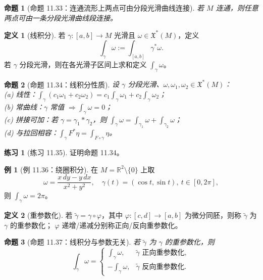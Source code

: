 \documentclass[12pt,a4paper]{article}
\theoremstyle{definition}
\newtheorem{definition}{定义}[section]
\newtheorem{example}{例}[section]
\newtheorem{exercise}{练习}[section]
\theoremstyle{plain}
\newtheorem{proposition}{命题}[section]
\newcommand{\R}{\mathbb{R}}
\newcommand{\X}{\mathfrak{X}}
\begin{document}
\begin{proposition}[命题 11.33：连通流形上两点可由分段光滑曲线连接]
若 $M$ 连通，则任意两点可由一条分段光滑曲线段连接。
\end{proposition}

\begin{definition}[线积分]
若 $\gamma:[a,b]\to M$ 光滑且 $\omega\in\X^*(M)$，定义
\[
\int_{\gamma}\omega := \int_{[a,b]}\gamma^*\omega.
\]
若 $\gamma$ 分段光滑，则在各光滑子区间上求和定义 $\int_\gamma\omega$。
\end{definition}

\begin{proposition}[命题 11.34：线积分性质]
设 $\gamma$ 分段光滑、$\omega,\omega_1,\omega_2\in\X^*(M)$：\\
(a) 线性：$\int_\gamma(c_1\omega_1+c_2\omega_2)=c_1\int_\gamma\omega_1+c_2\int_\gamma\omega_2$；\\
(b) 常曲线：$\gamma$ 常值 $\Rightarrow \int_\gamma\omega=0$；\\
(c) 拼接可加：若 $\gamma=\gamma_1*\gamma_2$，则 $\int_\gamma\omega=\int_{\gamma_1}\omega+\int_{\gamma_2}\omega$；\\
(d) 与拉回相容：$\int_\gamma F^*\eta=\int_{F\circ\gamma}\eta$。
\end{proposition}

\begin{exercise}[练习 11.35]
证明命题 11.34。
\end{exercise}

\begin{example}[例 11.36：绕圈积分]
在 $M=\R^2\setminus\{0\}$ 上取
\[
\omega=\frac{x\,dy-y\,dx}{x^2+y^2},
\quad \gamma(t)=(\cos t,\sin t),\ t\in[0,2\pi],
\]
则 $\displaystyle \int_\gamma \omega=2\pi$。
\end{example}

\begin{definition}[重参数化]
若 $\tilde\gamma=\gamma\circ\varphi$，其中 $\varphi:[c,d]\to[a,b]$ 为微分同胚，则称 $\tilde\gamma$ 为 $\gamma$ 的重参数化；
$\varphi$ 递增/递减分别称正向/反向重参数化。
\end{definition}

\begin{proposition}[命题 11.37：线积分与参数无关]
若 $\tilde\gamma$ 为 $\gamma$ 的重参数化，则
\[
\int_{\tilde\gamma}\omega=
\begin{cases}
\int_\gamma\omega,& \tilde\gamma\text{ 正向重参数化},\\
-\int_\gamma\omega,& \tilde\gamma\text{ 反向重参数化}.
\end{cases}
\]
\end{proposition}
\end{document}
